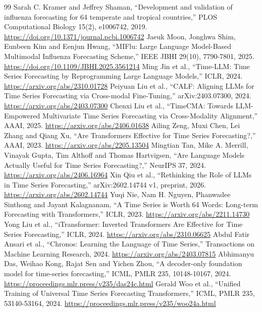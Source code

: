 \documentclass[journal,twoside,print]{ieeecolor}
\begin{document}
\balance\begin{thebibliography}{99}
 Sarah C. Kramer and Jeffrey Shaman, ``Development and validation of influenza forecasting for 64 temperate and tropical countries,'' PLOS Computational Biology 15(2), e1006742, 2019. \url{https://doi.org/10.1371/journal.pcbi.1006742}
 Jaeuk Moon, Jonghwa Shim, Eunbeen Kim and Eenjun Hwang, ``MIFlu: Large Language Model-Based Multimodal Influenza Forecasting Scheme,'' IEEE JBHI 29(10), 7790-7801, 2025. \url{https://doi.org/10.1109/JBHI.2025.3561214}
 Ming Jin et al., ``Time-LLM: Time Series Forecasting by Reprogramming Large Language Models,'' ICLR, 2024. \url{https://arxiv.org/abs/2310.01728}
 Peiyuan Liu et al., ``CALF: Aligning LLMs for Time Series Forecasting via Cross-modal Fine-Tuning,'' arXiv:2403.07300, 2024. \url{https://arxiv.org/abs/2403.07300}
 Chenxi Liu et al., ``TimeCMA: Towards LLM-Empowered Multivariate Time Series Forecasting via Cross-Modality Alignment,'' AAAI, 2025. \url{https://arxiv.org/abs/2406.01638}
 Ailing Zeng, Muxi Chen, Lei Zhang and Qiang Xu, ``Are Transformers Effective for Time Series Forecasting?,'' AAAI, 2023. \url{https://arxiv.org/abs/2205.13504}
 Mingtian Tan, Mike A. Merrill, Vinayak Gupta, Tim Althoff and Thomas Hartvigsen, ``Are Language Models Actually Useful for Time Series Forecasting?,'' NeurIPS 37, 2024. \url{https://arxiv.org/abs/2406.16964}
 Xin Qiu et al., ``Rethinking the Role of LLMs in Time Series Forecasting,'' arXiv:2602.14744 v1, preprint, 2026. \url{https://arxiv.org/abs/2602.14744}
 Yuqi Nie, Nam H. Nguyen, Phanwadee Sinthong and Jayant Kalagnanam, ``A Time Series is Worth 64 Words: Long-term Forecasting with Transformers,'' ICLR, 2023. \url{https://arxiv.org/abs/2211.14730}
 Yong Liu et al., ``iTransformer: Inverted Transformers Are Effective for Time Series Forecasting,'' ICLR, 2024. \url{https://arxiv.org/abs/2310.06625}
 Abdul Fatir Ansari et al., ``Chronos: Learning the Language of Time Series,'' Transactions on Machine Learning Research, 2024. \url{https://arxiv.org/abs/2403.07815}
 Abhimanyu Das, Weihao Kong, Rajat Sen and Yichen Zhou, ``A decoder-only foundation model for time-series forecasting,'' ICML, PMLR 235, 10148-10167, 2024. \url{https://proceedings.mlr.press/v235/das24c.html}
 Gerald Woo et al., ``Unified Training of Universal Time Series Forecasting Transformers,'' ICML, PMLR 235, 53140-53164, 2024. \url{https://proceedings.mlr.press/v235/woo24a.html}

\end{thebibliography}
\end{document}
